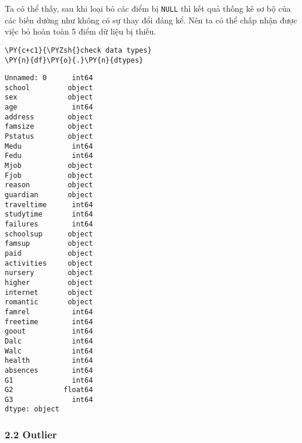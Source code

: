     Ta có thể thấy, sau khi loại bỏ các điểm bị \texttt{NULL} thì kết quả
thống kê sơ bộ của các biến dường như không có sự thay đổi đáng kể. Nên
ta có thể chấp nhận được việc bỏ hoàn toàn 5 điểm dữ liệu bị thiếu.

    \begin{tcolorbox}[breakable, size=fbox, boxrule=1pt, pad at break*=1mm,colback=cellbackground, colframe=cellborder]
\begin{Verbatim}[commandchars=\\\{\}]
\PY{c+c1}{\PYZsh{}check data types}
\PY{n}{df}\PY{o}{.}\PY{n}{dtypes}
\end{Verbatim}
\end{tcolorbox}

            \begin{tcolorbox}[breakable, size=fbox, boxrule=.5pt, pad at break*=1mm, opacityfill=0]
\begin{Verbatim}[commandchars=\\\{\}]
Unnamed: 0      int64
school         object
sex            object
age             int64
address        object
famsize        object
Pstatus        object
Medu            int64
Fedu            int64
Mjob           object
Fjob           object
reason         object
guardian       object
traveltime      int64
studytime       int64
failures        int64
schoolsup      object
famsup         object
paid           object
activities     object
nursery        object
higher         object
internet       object
romantic       object
famrel          int64
freetime        int64
goout           int64
Dalc            int64
Walc            int64
health          int64
absences        int64
G1              int64
G2            float64
G3              int64
dtype: object
\end{Verbatim}
\end{tcolorbox}
        
    \hypertarget{outlier}{%
\subsubsection{2.2 Outlier}\label{outlier}}

